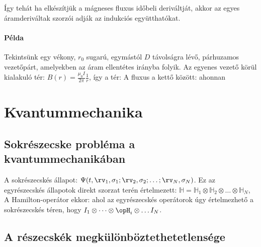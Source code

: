    Így tehát ha elkészítjük a mágneses fluxus időbeli deriváltját, akkor az egyes áramderiváltak szorzói adják az indukciós együtthatókat.
   
   \paragraph{Példa}
    
    Tekintsünk egy vékony, $r_0$ sugarú, egymástól $D$ távolságra lévő, párhuzamos vezetőpárt, amelyekben az áram ellentétes irányba folyik.
   Az egyenes vezető körül kialakuló tér: $B(r)=\frac{\mu_0 I}{2\pi}\frac{1}{r}$, így a tér:
    A fluxus a kettő között:
    ahonnan
   
 \section{Kvantummechanika}
  
  \subsection{Sokrészecske probléma a kvantummechanikában} 
   
   A sokrészecskés állapot: $\Psi(t,\rv_1,\sigma_1;\rv_2,\sigma_2;\dots;\rv_N,\sigma_N)$.
   Ez az egyrészecskés állapotok direkt szorzat terén értelmezett: $\mathbb{H}=\mathbb{H}_1\otimes\mathbb{H}_2\otimes\dots\otimes\mathbb{H}_N$,
   A Hamilton-operátor ekkor:
   ahol az egyrészecskés operátorok úgy értelmezhető a sokrészecskés téren, hogy $I_1\otimes\dots\otimes\opH_i\otimes\dots I_N$.
   
  \subsection{A részecskék megkülönböztethetetlensége}
   
